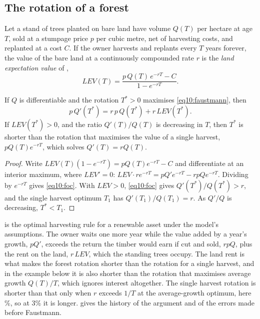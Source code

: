 \begin{chapterrefs}
\subsection{The rotation of a forest}

Let a stand of trees planted on bare land have volume $Q(T)$ per hectare at age $T$, sold at a stumpage
price $p$ per cubic metre, net of harvesting costs, and replanted at a cost $C$. If the owner harvests and
replants every $T$ years forever, the value of the bare land at a continuously compounded rate $r$ is the
\emph{land expectation value} of \textcite{faustmann1995},
\begin{equation}\label{eq10:faustmann}
  \mathit{LEV}(T)=\frac{p\,Q(T)\,e^{-rT}-C}{1-e^{-rT}} .
\end{equation}

\begin{proposition}\label{prop10:faustmann}
If $Q$ is differentiable and the rotation $T^*>0$ maximises \cref{eq10:faustmann}, then
\begin{equation}\label{eq10:foc}
  p\,Q'(T^*) = r\,p\,Q(T^*) + r\,\mathit{LEV}(T^*).
\end{equation}
If $\mathit{LEV}(T^*)>0$, and the ratio $Q'(T)/Q(T)$ is decreasing in $T$, then $T^*$ is shorter than the rotation that maximises the value of a single harvest,
$pQ(T)e^{-rT}$, which solves $Q'(T)=rQ(T)$.
\end{proposition}

\begin{proof}
Write $\mathit{LEV}(T)(1-e^{-rT})=pQ(T)e^{-rT}-C$ and differentiate at an interior maximum, where
$\mathit{LEV}'=0$: $\mathit{LEV}\cdot re^{-rT}=pQ'e^{-rT}-rpQe^{-rT}$. Dividing by $e^{-rT}$ gives
\cref{eq10:foc}. With $\mathit{LEV}>0$, \cref{eq10:foc} gives $Q'(T^*)/Q(T^*)>r$, and the single harvest
optimum $T_1$ has $Q'(T_1)/Q(T_1)=r$. As $Q'/Q$ is decreasing, $T^*<T_1$.
\end{proof}

 is the optimal harvesting rule for a renewable asset under the model's assumptions. The owner waits one more year while the value
added by a year's growth, $pQ'$, exceeds the return the timber would earn if cut and sold, $rpQ$, plus
the rent on the land, $r\,\mathit{LEV}$, which the standing trees occupy. The land rent is what makes the
forest rotation shorter than the rotation for a single harvest, and in the example below it is also
shorter than the rotation that maximises average growth $Q(T)/T$, which ignores interest altogether.
The single harvest rotation is shorter than that only when $r$ exceeds $1/T$ at the average-growth
optimum, here \tbRcross\%, so at 3\% it is longer. \textcite{samuelson1976}
gives the history of the argument and of the errors made before Faustmann.


\end{chapterrefs}
